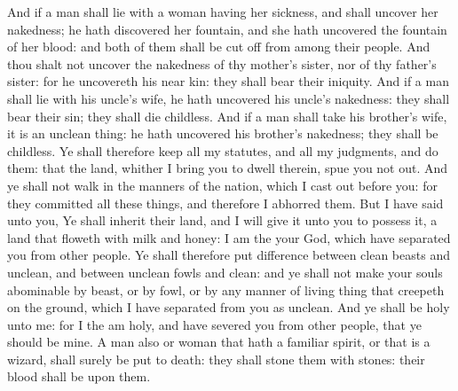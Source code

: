 \begin{biblechapter}
\verse And if a man shall lie with a woman having her sickness, and shall uncover her nakedness; he hath discovered her fountain, and she hath uncovered the fountain of her blood: and both of them shall be cut off from among their people.
\verse And thou shalt not uncover the nakedness of thy mother's sister, nor of thy father's sister: for he uncovereth his near kin: they shall bear their iniquity.
\verse And if a man shall lie with his uncle's wife, he hath uncovered his uncle's nakedness: they shall bear their sin; they shall die childless.
\verse And if a man shall take his brother's wife, it is an unclean thing: he hath uncovered his brother's nakedness; they shall be childless.
\verse Ye shall therefore keep all my statutes, and all my judgments, and do them: that the land, whither I bring you to dwell therein, spue you not out.
\verse And ye shall not walk in the manners of the nation, which I cast out before you: for they committed all these things, and therefore I abhorred them.
\verse But I have said unto you, Ye shall inherit their land, and I will give it unto you to possess it, a land that floweth with milk and honey: I am the \LORD your God, which have separated you from other people.
\verse Ye shall therefore put difference between clean beasts and unclean, and between unclean fowls and clean: and ye shall not make your souls abominable by beast, or by fowl, or by any manner of living thing that creepeth on the ground, which I have separated from you as unclean.
\verse And ye shall be holy unto me: for I the \LORD am holy, and have severed you from other people, that ye should be mine.
\verse A man also or woman that hath a familiar spirit, or that is a wizard, shall surely be put to death: they shall stone them with stones: their blood shall be upon them.
\end{biblechapter}

